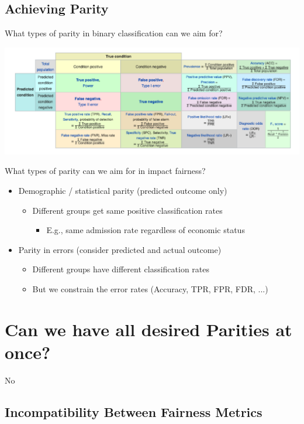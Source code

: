\documentclass[11pt]{article}
\theoremstyle{definition}
\begin{document}
\subsection{Achieving Parity}
What types of parity in binary classification can we aim for?

\includegraphics[width=\textwidth]{3.png}

What types of parity can we aim for in impact fairness?
\begin{itemize}
    \item Demographic / statistical parity (predicted outcome only)
    \begin{itemize}
        \item Different groups get same positive classification rates
        \begin{itemize}
            \item E.g., same admission rate regardless of economic status
        \end{itemize}
    \end{itemize}
    \item Parity in errors (consider predicted and actual outcome)
    \begin{itemize}
        \item Different groups have different classification rates
        \item But we constrain the error rates (Accuracy, TPR, FPR, FDR, ...)
    \end{itemize}
\end{itemize}

\section{Can we have all desired Parities at once?}
No

\subsection{Incompatibility Between Fairness Metrics}
\end{document}
